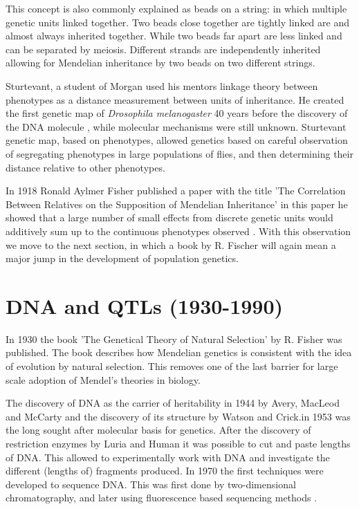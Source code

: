 This concept is also commonly explained as beads on a string: in which multiple genetic 
units linked together. Two beads close together are tightly linked are and almost always 
inherited together. While two beads far apart are less linked and can be separated by 
meiosis. Different strands are independently inherited allowing for Mendelian 
inheritance by two beads on two different strings.

Sturtevant, a student of Morgan used his mentors linkage theory between phenotypes 
as a distance measurement between units of inheritance. He created the first genetic 
map of \emph{Drosophila melanogaster} 40 years before the discovery of the DNA molecule \cite{Morgan:1915}, 
while molecular mechanisms were still unknown. Sturtevant genetic map, based on 
phenotypes, allowed genetics based on careful observation of segregating phenotypes in 
large populations of flies, and then determining their distance relative to other 
phenotypes.

In 1918 Ronald Aylmer Fisher published a paper with the title 'The Correlation Between 
Relatives on the Supposition of Mendelian Inheritance' in this paper he showed that a 
large number of small effects from discrete genetic units would additively sum up to 
the continuous phenotypes observed \cite{Fisher:1918}. With this observation we move 
to the next section, in which a book by R. Fischer will again mean a major jump in 
the development of population genetics.

\section{DNA and QTLs (1930-1990)}
In 1930 the book 'The Genetical Theory of Natural Selection' \cite{Fisher:1930} by R. 
Fisher was published. The book describes how Mendelian genetics is consistent with the 
idea of evolution by natural selection. This removes one of the last barrier for large 
scale adoption of Mendel's theories in biology.

The discovery of DNA as the carrier of heritability in 1944 by Avery, MacLeod and McCarty 
\cite{Avery:1944} and the discovery of its structure by Watson and Crick.in 1953 
\cite{Watson:1953} was the long sought after molecular basis for genetics. After the 
discovery of restriction enzymes by Luria and Human \cite{Luria:1952} it was possible 
to cut and paste lengths of DNA. This allowed to experimentally work with DNA and 
investigate the different (lengths of) fragments produced. In 1970 the first techniques 
were developed to sequence DNA. This was first done by two-dimensional chromatography, 
and later using fluorescence based sequencing methods \cite{Pettersson:2009}.

